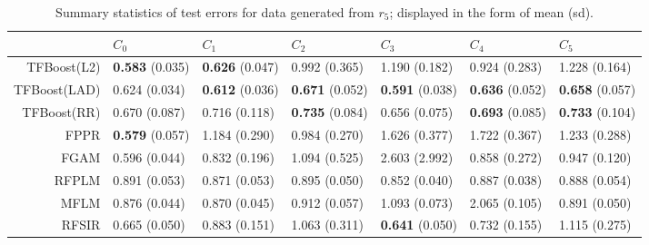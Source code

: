 \begin{table}[H]
\centering
\footnotesize
\begin{tabular}{rllllll}
  \hline
 & $C_0$ & $C_1$ & $C_2$ & $C_3$ & $C_4$ & $C_5$ \\ 
  \hline
TFBoost(L2) & \textbf{0.583} (0.035) & \textbf{0.626} (0.047) & 0.992 (0.365) & 1.190 (0.182) & 0.924 (0.283) & 1.228 (0.164) \\ 
  TFBoost(LAD) & 0.624 (0.034) & \textbf{0.612} (0.036) & \textbf{0.671} (0.052) & \textbf{0.591} (0.038) & \textbf{0.636} (0.052) & \textbf{0.658} (0.057) \\ 
  TFBoost(RR) & 0.670 (0.087) & 0.716 (0.118) & \textbf{0.735} (0.084) & 0.656 (0.075) & \textbf{0.693} (0.085) & \textbf{0.733} (0.104) \\ 
  FPPR & \textbf{0.579} (0.057) & 1.184 (0.290) & 0.984 (0.270) & 1.626 (0.377) & 1.722 (0.367) & 1.233 (0.288) \\ 
  FGAM & 0.596 (0.044) & 0.832 (0.196) & 1.094 (0.525) & 2.603 (2.992) & 0.858 (0.272) & 0.947 (0.120) \\ 
  RFPLM & 0.891 (0.053) & 0.871 (0.053) & 0.895 (0.050) & 0.852 (0.040) & 0.887 (0.038) & 0.888 (0.054) \\ 
  MFLM & 0.876 (0.044) & 0.870 (0.045) & 0.912 (0.057) & 1.093 (0.073) & 2.065 (0.105) & 0.891 (0.050) \\ 
  RFSIR & 0.665 (0.050) & 0.883 (0.151) & 1.063 (0.311) & \textbf{0.641} (0.050) & 0.732 (0.155) & 1.115 (0.275) \\ 
   \hline
\end{tabular}
\caption{Summary statistics of test errors for data generated from $r_5$; displayed in the form of mean (sd).} 
\end{table}
